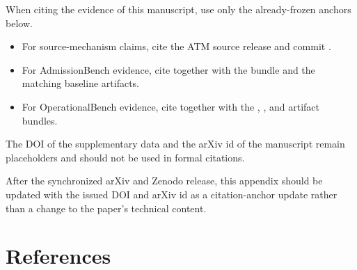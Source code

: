 \documentclass[9pt,letterpaper]{extarticle}
\begin{document}
When citing the evidence of this manuscript, use only the already-frozen anchors below.

\begin{itemize}
\item For source-mechanism claims, cite the ATM source release \texttt{} and commit \texttt{}.
\item For AdmissionBench evidence, cite \texttt{} together with the \texttt{} bundle and the matching \texttt{} baseline artifacts.
\item For OperationalBench evidence, cite \texttt{} together with the \texttt{}, \texttt{}, and \texttt{} artifact bundles.
\end{itemize}

The DOI of the supplementary data and the arXiv id of the manuscript remain placeholders and should not be used in formal citations.

After the synchronized arXiv and Zenodo release, this appendix should be updated with the issued DOI and arXiv id as a citation-anchor update rather than a change to the paper's technical content.

\section*{References}
\end{document}
